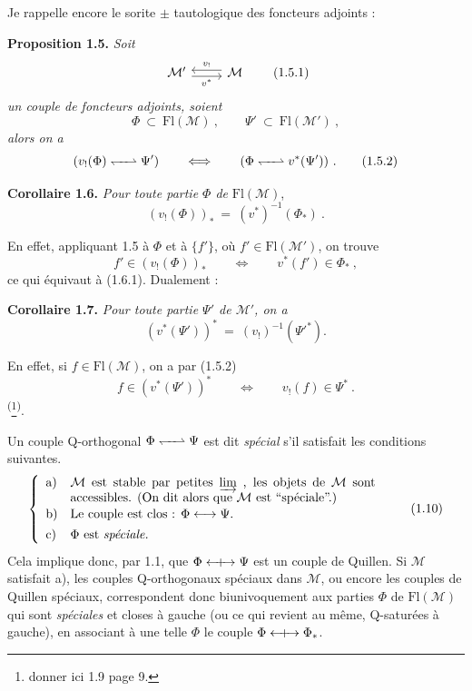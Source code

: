 \documentclass[11pt]{article}
\newcommand{\printedpage}[1]{\marginpar{\footnotesize p.~#1}}
\newcommand{\msp}[1]{\marginpar{\footnotesize [#1]}}
\newcommand{\Qorth}{\mathrel{\leftharpoondown\mkern-6mu\relbar\mkern-6mu\rightharpoonup}}
\newcommand{\Qcouple}{\mathrel{\leftarrow\mkern-9mu{+}\mkern-9mu\rightarrow}}
\newcommand{\clos}{\longleftrightarrow}
\begin{document}
Je rappelle encore le sorite $\pm$ tautologique des foncteurs adjoints :

\textbf{Proposition 1.5.} \textit{Soit}
\[
\begin{tikzcd}
\mathcal{M}' \arrow[r, shift right=1, "v^{*}"'] & \mathcal{M} \arrow[l, shift right=1, "v_{!}"']
\end{tikzcd}
\tag*{(1.5.1)}
\]
\textit{un couple de foncteurs adjoints, soient}
\[
\Phi \ \subset\ \mathrm{Fl}(\mathcal{M})\ , \qquad \Psi' \ \subset\ \mathrm{Fl}(\mathcal{M}')\ ,
\]
\textit{alors on a}
\[
(v_{!}(\Phi) \Qorth \Psi') \qquad \Longleftrightarrow \qquad (\Phi \Qorth v^{*}(\Psi'))\ . \tag*{(1.5.2)}
\]

\textbf{Corollaire 1.6.} \textit{Pour toute partie $\Phi$ de} $\mathrm{Fl}(\mathcal{M})$,
\[
(v_{!}(\Phi))_{*} \ =\ (v^{*})^{-1}(\Phi_{*})\ . \tag*{(1.6.1)}
\]

\printedpage{5}

En effet, appliquant 1.5 à $\Phi$ et à $\{f'\}$, où $f' \in \mathrm{Fl}(\mathcal{M}')$, on trouve
\[
f' \in (v_{!}(\Phi))_{*} \qquad \Longleftrightarrow \qquad v^{*}(f') \in \Phi_{*}\ ,
\]
ce qui équivaut à (1.6.1). Dualement :

\textbf{Corollaire 1.7.} \textit{Pour toute partie $\Psi'$ de $\mathcal{M}'$, on a}
\[
(v^{*}(\Psi'))^{*} \ =\ (v_{!})^{-1}(\Psi'^{*}). \tag*{(1.7.1)}
\]

En effet, si $f \in \mathrm{Fl}(\mathcal{M})$, on a par (1.5.2)
\[
f \in (v^{*}(\Psi'))^{*} \qquad \Longleftrightarrow \qquad v_{!}(f) \in \Psi^{*}\ . %
\]
\textsuperscript{(}\footnote[3]{donner ici 1.9 page 9.}\textsuperscript{)}.

\msp{page 8}
Un couple Q-orthogonal $\Phi \Qorth \Psi$ est dit \textit{spécial} s'il satisfait les conditions suivantes.
\[
\left\{
\begin{array}{ll}
\text{a)} & \parbox[t]{0.7\textwidth}{$\mathcal{M}$ est stable par petites $\varinjlim$ , les objets de $\mathcal{M}$ sont accessibles. (On dit alors que $\mathcal{M}$ est “spéciale”.)} \\[3ex]
\text{b)} & \text{Le couple est clos : } \Phi \clos \Psi. \\[1ex]
\text{c)} & \Phi \text{ est \textit{spéciale.}}
\end{array}
\right.
\tag*{(1.10)}
\]
Cela implique donc, par 1.1, que $\Phi \Qcouple \Psi$ est un couple de Quillen. Si $\mathcal{M}$ satisfait a), les couples Q-orthogonaux spéciaux dans $\mathcal{M}$, ou encore les couples de Quillen spéciaux, correspondent donc biunivoquement aux parties $\Phi$ de $\mathrm{Fl}(\mathcal{M})$ qui sont \textit{spéciales} et closes à gauche (ou ce qui revient au même, Q-saturées à gauche), en associant à une telle $\Phi$ le couple $\Phi \Qcouple \Phi_{*}$.
\end{document}
